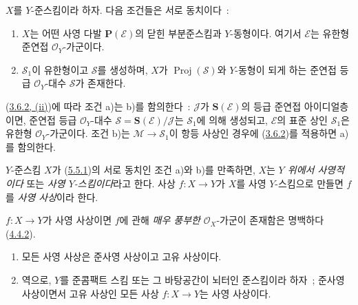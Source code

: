 \begin{proposition}[5.5.1]
\label{II.5.5.1-ko}
$X$를 $Y$-준스킴이라 하자. 다음 조건들은 서로 동치이다~:
\begin{enumerate}
  \item[\rm{a)}] $X$는 어떤 사영 다발 $\mathbf{P}(\mathcal{E})$의 닫힌
  부분준스킴과 $Y$-동형이다. 여기서 $\mathcal{E}$는 유한형 준연접
  $\mathcal{O}_Y$-가군이다.
  \item[\rm{b)}] $\mathcal{S}_1$이 유한형이고 $\mathcal{S}$를 생성하며,
  $X$가 $\operatorname{Proj}(\mathcal{S})$와 $Y$-동형이 되게 하는 준연접
  등급 $\mathcal{O}_Y$-대수 $\mathcal{S}$가 존재한다.
\end{enumerate}
\end{proposition}

(\hyperref[II.3.6.2-ko]{3.6.2, (ii)})에 따라 조건 a)는 b)를 함의한다~:
$\mathcal{J}$가 $\mathbf{S}(\mathcal{E})$의 등급 준연접 아이디얼층이면,
준연접 등급 $\mathcal{O}_Y$-대수
$\mathcal{S}=\mathbf{S}(\mathcal{E})/\mathcal{J}$는
$\mathcal{S}_1$에 의해 생성되고, $\mathcal{E}$의 표준 상인
$\mathcal{S}_1$은 유한형 $\mathcal{O}_Y$-가군이다. 조건 b)는
$\mathcal{M}\to\mathcal{S}_1$이 항등 사상인 경우에
(\hyperref[II.3.6.2-ko]{3.6.2})를 적용하면 a)를 함의한다.


\begin{definition}[5.5.2]
\label{II.5.5.2-ko}
$Y$-준스킴 $X$가 (\hyperref[II.5.5.1-ko]{5.5.1})의 서로 동치인 조건
a)와 b)를 만족하면, $X$는 \emph{$Y$ 위에서 사영적이다} 또는
\emph{사영 $Y$-스킴이다}라고 한다. 사상 $f:X\to Y$가 $X$를 사영
$Y$-스킴으로 만들면 $f$를 \emph{사영 사상}이라 한다.
\end{definition}

$f:X\to Y$가 사영 사상이면 $f$에 관해 \emph{매우 풍부한}
$\mathcal{O}_X$-가군이 존재함은 명백하다
(\hyperref[II.4.4.2-ko]{4.4.2}).

\begin{theorem}[5.5.3]
\label{II.5.5.3-ko}
\begin{enumerate}
  \item[\rm{(i)}] 모든 사영 사상은 준사영 사상이고 고유 사상이다.
  \item[\rm{(ii)}] 역으로, $Y$를 준콤팩트 스킴 또는 그 바탕공간이
  뇌터인 준스킴이라 하자~; 준사영 사상이면서 고유 사상인 모든 사상
  $f:X\to Y$는 사영 사상이다.
\end{enumerate}
\end{theorem}

